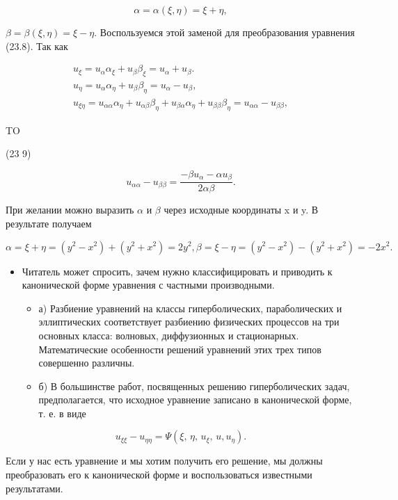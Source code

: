 \documentclass[
  ukrainian,
]{article}
\providecommand{\tightlist}{%
  \setlength{\itemsep}{0pt}\setlength{\parskip}{0pt}}
\begin{document}
\[
\alpha = \alpha (\xi, \eta) = \xi + \eta,
\]

\(\beta = \beta (\xi, \eta) = \xi - \eta.\) Воспользуемся этой заменой
для преобразования уравнения (23.8). Так как

\[
\begin{array}{l} u_{\xi} = u_{\alpha}\alpha_{\xi} + u_{\beta}\beta_{\xi} = u_{\alpha} + u_{\beta}. \\ u_{\eta} = u_{\alpha}\alpha_{\eta} + u_{\beta}\beta_{\eta} = u_{\alpha} - u_{\beta}, \\ u_{\xi\eta} = u_{\alpha\alpha}\alpha_{\eta} + u_{\alpha\beta}\beta_{\eta} + u_{\beta\alpha}\alpha_{\eta} + u_{\beta\beta}\beta_{\eta} = u_{\alpha\alpha} - u_{\beta\beta}, \end{array}
\]

TO

(23 9)

\[
u_{\alpha\alpha} - u_{\beta\beta} = \frac{-\beta u_{\alpha} - \alpha u_{\beta}}{2\alpha\beta}.
\]

При желании можно выразить \(\alpha\) и \(\beta\) через исходные
координаты x и y. В результате получаем

\[
\alpha = \xi + \eta = (y^2 - x^2) + (y^2 + x^2) = 2y^2,
\beta = \xi - \eta = (y^2 - x^2) - (y^2 + x^2) = -2x^2.
\]

\begin{itemize}
\tightlist
\item
  Читатель может спросить, зачем нужно классифицировать и приводить к
  канонической форме уравнения с частными производными.

  \begin{itemize}
  \tightlist
  \item
    а) Разбиение уравнений на классы гиперболических, параболических и
    эллиптических соответствует разбиению физических процессов на три
    основных класса: волновых, диффузионных и стационарных.
    Математические особенности решений уравнений этих трех типов
    совершенно различны.
  \item
    б) В большинстве работ, посвященных решению гиперболических задач,
    предполагается, что исходное уравнение записано в канонической
    форме, т. е. в виде
  \end{itemize}
\end{itemize}

\[
u_{\xi\xi} - u_{\eta\eta} = \Psi(\xi, \, \eta, \, u_{\xi}, \, u, u_{\eta}).
\]

Если у нас есть уравнение и мы хотим получить его решение, мы должны
преобразовать его к канонической форме и воспользоваться известными
результатами.
\end{document}
